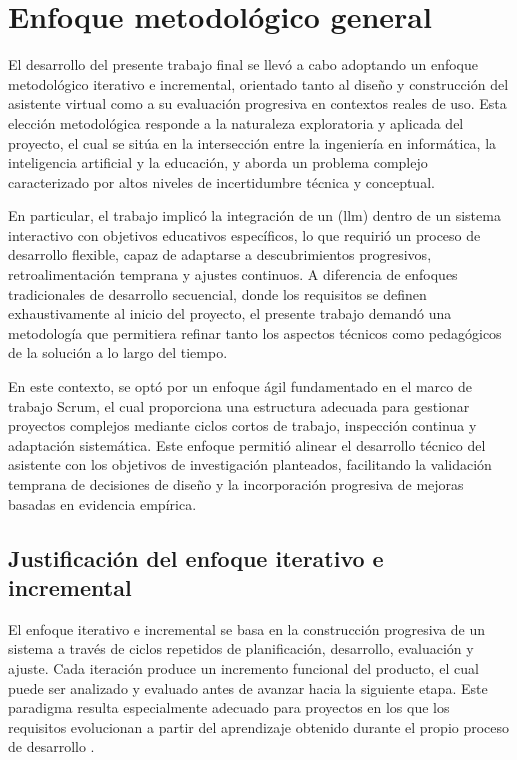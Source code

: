 \section{Enfoque metodológico general}

El desarrollo del presente trabajo final se llevó a cabo adoptando un enfoque metodológico iterativo e incremental, orientado tanto al diseño y construcción del asistente virtual como a su evaluación progresiva en contextos reales de uso. Esta elección metodológica responde a la naturaleza exploratoria y aplicada del proyecto, el cual se sitúa en la intersección entre la ingeniería en informática, la inteligencia artificial y la educación, y aborda un problema complejo caracterizado por altos niveles de incertidumbre técnica y conceptual.

En particular, el trabajo implicó la integración de un (\gls{llm}) dentro de un sistema interactivo con objetivos educativos específicos, lo que requirió un proceso de desarrollo flexible, capaz de adaptarse a descubrimientos progresivos, retroalimentación temprana y ajustes continuos. A diferencia de enfoques tradicionales de desarrollo secuencial, donde los requisitos se definen exhaustivamente al inicio del proyecto, el presente trabajo demandó una metodología que permitiera refinar tanto los aspectos técnicos como pedagógicos de la solución a lo largo del tiempo.

En este contexto, se optó por un enfoque ágil fundamentado en el marco de trabajo Scrum, el cual proporciona una estructura adecuada para gestionar proyectos complejos mediante ciclos cortos de trabajo, inspección continua y adaptación sistemática. Este enfoque permitió alinear el desarrollo técnico del asistente con los objetivos de investigación planteados, facilitando la validación temprana de decisiones de diseño y la incorporación progresiva de mejoras basadas en evidencia empírica.

\subsection{Justificación del enfoque iterativo e incremental}

El enfoque iterativo e incremental se basa en la construcción progresiva de un sistema a través de ciclos repetidos de planificación, desarrollo, evaluación y ajuste. Cada iteración produce un incremento funcional del producto, el cual puede ser analizado y evaluado antes de avanzar hacia la siguiente etapa. Este paradigma resulta especialmente adecuado para proyectos en los que los requisitos evolucionan a partir del aprendizaje obtenido durante el propio proceso de desarrollo \parencite{rath2025agile, dong2024agile}.

